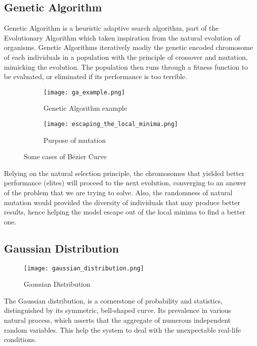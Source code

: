 \subsection{Genetic Algorithm}
Genetic Algorithm is a heuristic adaptive search algorithm, part of the Evolutionary Algorithm which taken inspiration from the natural evolution of organisms. Genetic Algorithms iteratively modiy the genetic encoded chromosome of each individuals in a population with the principle of crossover and mutation, mimicking the evolution. The population then runs through a fitness function to be evaluated, or eliminated if its performance is too terrible.
\begin{figure}[H]
  \centering
  \begin{subfigure}[b]{0.45\textwidth}
    \texttt{[image: ga\_example.png]}
    \caption{Genetic Algorithm example}
  \end{subfigure}
  \begin{subfigure}[b]{0.45\textwidth}
    \texttt{[image: escaping\_the\_local\_minima.png]}
    \caption{Purpose of mutation}
  \end{subfigure}
  \caption{Some cases of Bézier Curve}
\end{figure}
\noindent
Relying on the natural selection principle, the chromosomes that yielded better performance (elites) will proceed to the next evolution, converging to an answer of the problem that we are trying to solve. Also, the randomness of natural mutation would provided the diversity of individuals that may produce better results, hence helping the model escape out of the local minima to find a better one.

\subsection{Gaussian Distribution}
\begin{wrapfigure}{r}{0.4\textwidth}
  \centering
  \addtolength{\belowcaptionskip}{-0.3ex}
  \texttt{[image: gaussian\_distribution.png]}
  \caption{Gaussian Distribution}
\end{wrapfigure}

The Gaussian distribution, is a cornerstone of probability and statistics, distinguished by its symmetric, bell-shaped curve. Its prevalence in various natural process, which asserts that the aggregate of numerous independent random variables. This help the system to deal with the unexpectable real-life conditions.

